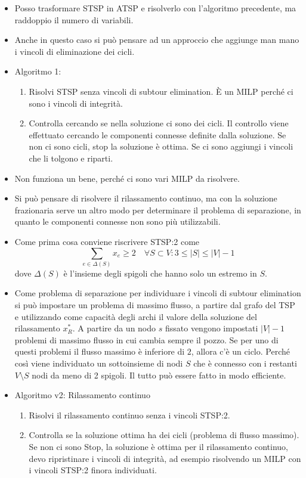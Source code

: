 \begin{itemize}
	\item Posso trasformare STSP in ATSP e risolverlo con l'algoritmo precedente, ma raddoppio il numero di variabili.
	\item Anche in questo caso si può pensare ad un approccio che aggiunge man mano i vincoli di eliminazione dei cicli.
	\item Algoritmo 1:
	\begin{enumerate}
		\item Risolvi STSP senza vincoli di subtour elimination. \`E un MILP perché ci sono i vincoli di integrità.
		\item Controlla cercando se nella soluzione ci sono dei cicli. Il controllo viene effettuato cercando le componenti connesse definite dalla soluzione. Se non ci sono cicli, stop la soluzione è ottima. Se ci sono aggiungi i vincoli che li tolgono e riparti.
	\end{enumerate}
	\item Non funziona un bene, perché ci sono vari MILP da risolvere.
	\item Si può pensare di risolvere il rilassamento continuo, ma con la soluzione frazionaria serve un altro modo per determinare il problema di separazione, in quanto le componenti connesse non sono più utilizzabili.
	\item Come prima cosa conviene riscrivere STSP:2 come
	$$
	\sum\limits_{e \in \varDelta(S)} x_e \geq 2 \quad \forall S \subset V : 3 \leq |S| \leq |V| -1
	$$
	dove $\varDelta(S)$ è l'insieme degli spigoli che hanno solo un estremo in $S$.
	\item Come problema di separazione per individuare i vincoli di subtour elimination si può impostare un problema di massimo flusso, a partire dal grafo del TSP e utilizzando come capacità degli archi il valore della soluzione del rilassamento $x_{R}^*$. A partire da un nodo $s$ fissato vengono impostati $|V|-1$ problemi di massimo flusso in cui cambia sempre il pozzo. Se per uno di questi problemi il flusso massimo è inferiore di $2$, allora c'è un ciclo. Perché così viene individuato un sottoinsieme di nodi $S$ che è connesso con i restanti $V\setminus S$ nodi da meno di 2 spigoli. Il tutto può essere fatto in modo efficiente.
	\item Algoritmo v2: Rilassamento continuo
	\begin{enumerate}
		\item Risolvi il rilassamento continuo senza i vincoli STSP:2.
		\item Controlla se la soluzione ottima ha dei cicli (problema di flusso massimo). Se non ci sono Stop, la soluzione è ottima per il rilassamento continuo, devo ripristinare i vincoli di integrità, ad esempio risolvendo un MILP con i vincoli STSP:2 finora individuati.

\end{enumerate}
\end{itemize}

